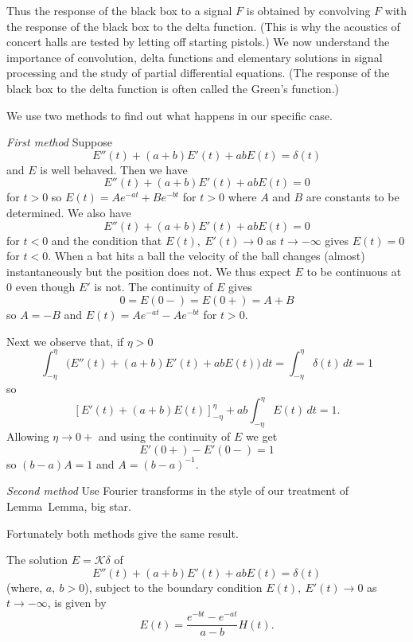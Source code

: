 Thus the response of the black box to a signal $F$
is obtained by convolving $F$ with the response of
the black box to the delta function. (This is why
the acoustics of concert halls are tested by letting off
starting pistols.) We now understand the importance
of convolution, delta functions and elementary solutions
in signal processing and the study of partial differential
equations. (The response of
the black box to the delta function is often called
the Green's function.)

We use two methods to find out what happens in our specific case.

\noindent\emph{First method} Suppose
\begin{equation*}
\tag*{$\bigstar$}
E''(t)+(a+b)E'(t)+ab E(t)=\delta(t)
\end{equation*}
and $E$ is well behaved. Then we have
\[E''(t)+(a+b)E'(t)+ab E(t)=0\]
for $t>0$ so $E(t)=Ae^{-at}+Be^{-bt}$ for $t>0$ where
$A$ and $B$ are constants to be determined. We also
have
\[E''(t)+(a+b)E'(t)+ab E(t)=0\]
for $t<0$ and the condition that $E(t),\ E'(t)\rightarrow 0$
as $t\rightarrow-\infty$ gives $E(t)=0$ for $t<0$.
When a bat hits a ball the velocity of the ball changes
(almost) instantaneously but the position does not.
We thus expect $E$ to be continuous at $0$ even though
$E'$ is not. The continuity of $E$ gives
\[0=E(0-)=E(0+)=A+B\]
so $A=-B$ and $E(t)=Ae^{-at}-Ae^{-bt}$ for $t>0$.

Next we observe that, if $\eta>0$
\[\int_{-\eta}^{\eta}\big(E''(t)+(a+b)E'(t)+ab E(t)\big)\,dt=
\int_{-\eta}^{\eta}\delta(t)\,dt=1\]
so
\[\left[E'(t)+(a+b)E(t)\right]_{-\eta}^{\eta}
+ab\int_{-\eta}^{\eta}E(t)\,dt=1.\]
Allowing $\eta\rightarrow 0+$ and using the continuity
of $E$ we get
\[E'(0+)-E'(0-)=1\]
so $(b-a)A=1$ and $A=(b-a)^{-1}$.

\noindent\emph{Second method} Use Fourier transforms
in the style of our treatment of Lemma~{Lemma, big star}.

Fortunately both methods give the same result.
\begin{lemma}\label{Lemma, Big elementary}
The solution $E={\mathcal K}\delta$ of
\begin{equation*}
\tag*{$\bigstar$}
E''(t)+(a+b)E'(t)+ab E(t)=\delta(t)
\end{equation*}
(where, $a,\ b>0$), subject to the boundary condition
$E(t),\ E'(t)\rightarrow 0$ as $t\rightarrow -\infty$,
is given by
\[E(t)=\frac{e^{-bt}-e^{-at}}{a-b}H(t).\]
\end{lemma}

